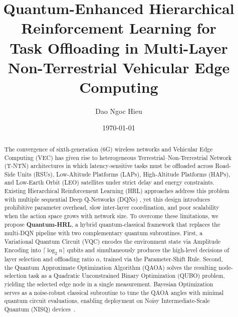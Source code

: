 \documentclass[11pt,a4paper]{article}
\title{\textbf{Quantum-Enhanced Hierarchical Reinforcement Learning for\\
Task Offloading in Multi-Layer Non-Terrestrial Vehicular Edge Computing}}
\author[1]{Dao Ngoc Hieu}
\affil[1]{Faculty of Information Technology, National Economic University, Hanoi, Vietnam}
\date{\today}
\theoremstyle{definition}
\begin{document}
\maketitle

\begin{abstract}
The convergence of sixth-generation (6G) wireless networks and Vehicular Edge Computing (VEC) has given rise to heterogeneous Terrestrial--Non-Terrestrial Network (T-NTN) architectures in which latency-sensitive tasks must be offloaded across Road-Side Units (RSUs), Low-Altitude Platforms (LAPs), High-Altitude Platforms (HAPs), and Low-Earth Orbit (LEO) satellites under strict delay and energy constraints. Existing Hierarchical Reinforcement Learning (HRL) approaches address this problem with multiple sequential Deep Q-Networks (DQNs) \cite{hrl_ntn}, yet this design introduces prohibitive parameter overhead, slow inter-layer coordination, and poor scalability when the action space grows with network size.
To overcome these limitations, we propose \textbf{Quantum-HRL}, a hybrid quantum-classical framework that replaces the multi-DQN pipeline with two complementary quantum subroutines. First, a Variational Quantum Circuit (VQC) \cite{vqc_drl} encodes the environment state via Amplitude Encoding into $\lceil\log_2 n\rceil$ qubits and simultaneously produces the high-level decisions of layer selection and offloading ratio $\alpha$, trained via the Parameter-Shift Rule. Second, the Quantum Approximate Optimization Algorithm (QAOA) \cite{farhi2014quantum} solves the resulting node-selection task as a Quadratic Unconstrained Binary Optimization (QUBO) problem, yielding the selected edge node in a single measurement. Bayesian Optimization~\cite{bo_qaoa} serves as a noise-robust classical subroutine to tune the QAOA angles with minimal quantum circuit evaluations, enabling deployment on Noisy Intermediate-Scale Quantum (NISQ) devices~\cite{preskill2018nisq}.

\end{abstract}
\end{document}

